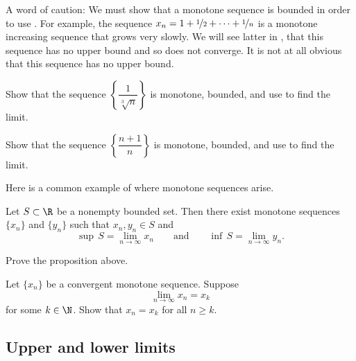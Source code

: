 \documentclass[12pt]{book}
\begin{document}
\begin{example}
A word of caution:  
We must show that a monotone sequence is bounded in order to use .
For example, the sequence $x_n=1 + \nicefrac{1}{2} + \cdots + \nicefrac{1}{n}$ is a monotone increasing sequence that grows very slowly.
We will see latter in , that this sequence has no upper bound and so does not converge.
It is not at all obvious that this sequence has no upper bound.
\end{example}

\begin{exercise}
Show that the sequence
$\left\{ \dfrac{1}{\sqrt[3]{n}} \right\}$ is monotone, bounded, and use  to find the limit.
\end{exercise}

\begin{exercise}
Show that the sequence
$\left\{ \dfrac{n+1}{n} \right\}$
is monotone, bounded, and use
 to find the limit.
\end{exercise}

Here is a common example of where monotone sequences arise.

\begin{prop} \label{prop:supinfseq}
Let $S \subset \R$ be a nonempty bounded set.
Then there exist monotone sequences
$\{ x_n \}$ and $\{ y_n \}$ such that $x_n, y_n \in S$ and
\begin{equation*}
\sup\,S = \lim_{n\to \infty} x_n \qquad \text{and} \qquad \inf\,S =
\lim_{n\to\infty} y_n .
\end{equation*}
\end{prop}

\begin{exercise}
Prove the proposition above.
\end{exercise}

\begin{exercise}
Let $\{ x_n \}$ be a convergent monotone sequence.
Suppose 
\begin{equation*}
\lim_{n\to \infty} x_n = x_k 
\end{equation*}
for some $k\in\N$.
Show that $x_n = x_k$ for all $n \geq k$.
\end{exercise}


\subsection*{Upper and lower limits}\label{sec:bw}
\end{document}
